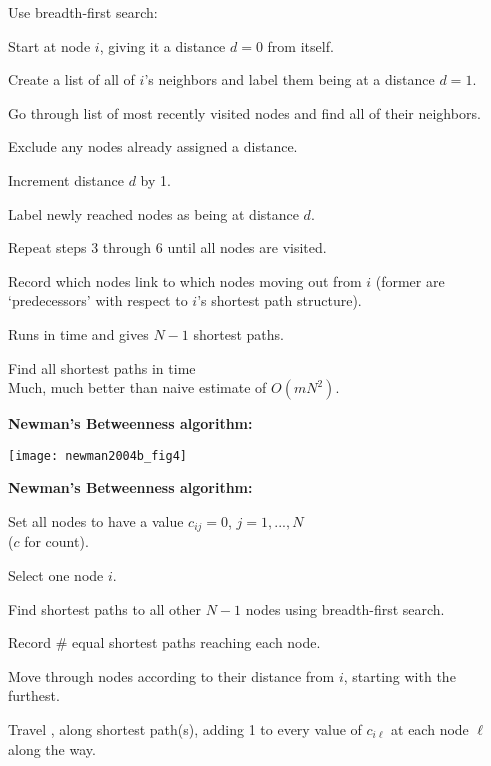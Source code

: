       Use \alert{breadth-first search:}
    
       
        Start at node $i$, giving it a distance $d=0$ from itself.
      
        Create a list of all of $i$'s neighbors and label them
        being at a distance $d=1$.
      
        Go through list of most recently visited nodes
        and find all of their neighbors.
      
        Exclude any nodes already assigned a distance.
      
        Increment distance $d$ by 1.
      
        Label newly reached nodes as being at distance $d$.
      
        Repeat steps 3 through 6 until all nodes are visited.
      
    
      Record which nodes link to which nodes moving
      out from $i$ (former are `predecessors' with respect
      to $i$'s shortest path structure).
    
      Runs in  time and gives $N-1$ shortest paths.
    
      Find all shortest paths in  time\\
    
      Much, much better than naive estimate of $O (mN^2)$.
    
  

  \textbf{Newman's Betweenness algorithm:\cite{newman2001d}}

  \texttt{[image: newman2004b\_fig4]}
  

  \textbf{Newman's Betweenness algorithm:\cite{newman2001d}}
  
  
  
    Set all nodes to have a value $c_{ij}=0$, $j=1,...,N$\\
    ($c$ for count).
  
    Select one node $i$.
  
    Find \alert{shortest paths} to all other $N-1$ nodes using
    breadth-first search.
  
    Record \# equal shortest paths reaching each node.
  
    Move through nodes according to their distance from
    $i$, starting with the furthest.
  
    Travel , 
    along shortest path(s), adding
    1 to every value of $c_{i \ell}$ at each node $\ell$ along the way.
  
